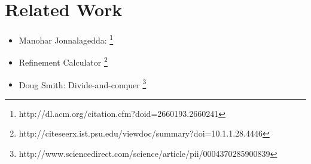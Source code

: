 \section{Related Work}
\label{related}

\begin{itemize}
\color{Gray}
\item Manohar Jonnalagedda: \cite{OOPSLA14/Jonnalagedda} \footnote{http://dl.acm.org/citation.cfm?doid=2660193.2660241}
\item Refinement Calculator \cite{TPHOLs96/Butler} \footnote{http://citeseerx.ist.psu.edu/viewdoc/summary?doi=10.1.1.28.4446}
\item Doug Smith: Divide-and-conquer\cite{AI85/Smith} \footnote{http://www.sciencedirect.com/science/article/pii/0004370285900839}
\end{itemize}